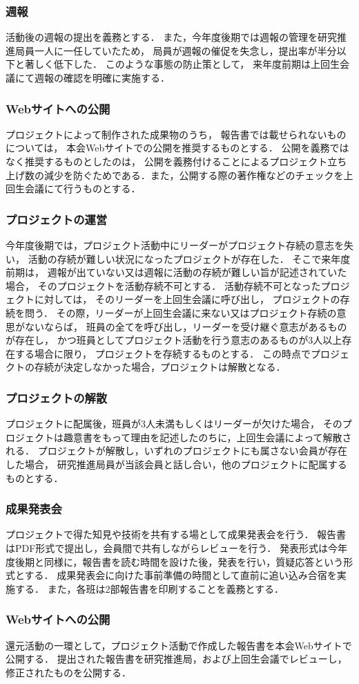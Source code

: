 \subsubsection*{週報}
活動後の週報の提出を義務とする．
また，今年度後期では週報の管理を研究推進局員一人に一任していたため，
局員が週報の催促を失念し，提出率が半分以下と著しく低下した．
このような事態の防止策として，
来年度前期は上回生会議にて週報の確認を明確に実施する．

\subsubsection*{Webサイトへの公開}
プロジェクトによって制作された成果物のうち，
報告書では載せられないものについては，
本会Webサイトでの公開を推奨するものとする．
公開を義務ではなく推奨するものとしたのは，
公開を義務付けることによるプロジェクト立ち上げ数の減少を防ぐためである．また，公開する際の著作権などのチェックを上回生会議にて行うものとする．


\subsubsection*{プロジェクトの運営}
今年度後期では，プロジェクト活動中にリーダーがプロジェクト存続の意志を失い，
活動の存続が難しい状況になったプロジェクトが存在した．
そこで来年度前期は，
週報が出ていない又は週報に活動の存続が難しい旨が記述されていた場合，
そのプロジェクトを活動存続不可とする．
活動存続不可となったプロジェクトに対しては，
そのリーダーを上回生会議に呼び出し，
プロジェクトの存続を問う．
その際，リーダーが上回生会議に来ない又はプロジェクト存続の意思がないならば，
班員の全てを呼び出し，リーダーを受け継ぐ意志があるものが存在し，
かつ班員としてプロジェクト活動を行う意志のあるものが3人以上存在する場合に限り，
プロジェクトを存続するものとする．
この時点でプロジェクトの存続が決定しなかった場合，プロジェクトは解散となる．

\subsubsection*{プロジェクトの解散}
プロジェクトに配属後，班員が3人未満もしくはリーダーが欠けた場合，
そのプロジェクトは趣意書をもって理由を記述したのちに，上回生会議によって解散される．
プロジェクトが解散し，いずれのプロジェクトにも属さない会員が存在した場合，
研究推進局員が当該会員と話し合い，他のプロジェクトに配属するものとする．

\subsubsection*{成果発表会}
プロジェクトで得た知見や技術を共有する場として成果発表会を行う．
報告書はPDF形式で提出し，会員間で共有しながらレビューを行う．
発表形式は今年度後期と同様に，報告書を読む時間を設けた後，発表を行い，質疑応答という形式とする．
成果発表会に向けた事前準備の時間として直前に追い込み合宿を実施する．
また，各班は2部報告書を印刷することを義務とする．

\subsubsection*{Webサイトへの公開}
還元活動の一環として，プロジェクト活動で作成した報告書を本会Webサイトで公開する．
提出された報告書を研究推進局，および上回生会議でレビューし，修正されたものを公開する．
